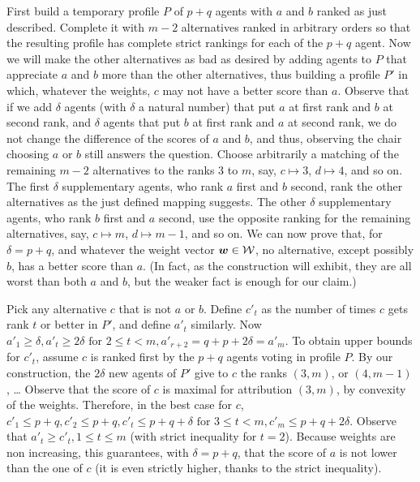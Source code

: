 First build a temporary profile $P$ of $p+q$ agents with $a$ and $b$ ranked as just described. Complete it with $m-2$ alternatives ranked in arbitrary orders so that the resulting profile has complete strict rankings for each of the $p+q$ agent. Now we will make the other alternatives as bad as desired by adding agents to $P$ that appreciate $a$ and $b$ more than the other alternatives, thus building a profile $P'$ in which, whatever the weights, $c$ may not have a better score than $a$. Observe that if we add $\delta$ agents (with $\delta$ a natural number) that put $a$ at first rank and $b$ at second rank, and $\delta$ agents that put $b$ at first rank and $a$ at second rank, we do not change the difference of the scores of $a$ and $b$, and thus, observing the chair choosing $a$ or $b$ still answers the question. Choose arbitrarily a matching of the remaining $m-2$ alternatives to the ranks $3$ to $m$, say, $c \mapsto 3$, $d \mapsto 4$, and so on. The first $\delta$ supplementary agents, who rank $a$ first and $b$ second, rank the other alternatives as the just defined mapping suggests. The other $\delta$ supplementary agents, who rank $b$ first and $a$ second, use the opposite ranking for the remaining alternatives, say, $c \mapsto m$, $d \mapsto m-1$, and so on. We can now prove that, for $\delta = p+q$, and whatever the weight vector $\bm{w} \in \mathcal{W}$, no alternative, except possibly $b$, has a better score than $a$. (In fact, as the construction will exhibit, they are all worst than both $a$ and $b$, but the weaker fact is enough for our claim.)

Pick any alternative $c$ that is not $a$ or $b$. 
Define $c'_t$ as the number of times $c$ gets rank $t$ or better in $P'$, and define $a'_t$ similarly. Now $a'_1 ≥ \delta, a'_t ≥ 2\delta \text{ for } 2 ≤ t < m, a'_{r+2} = q+p+2\delta = a'_m$. To obtain upper bounds for $c'_t$, assume $c$ is ranked first by the $p+q$ agents voting in profile $P$. By our construction, the  $2 \delta$ new agents of $P'$ give to $c$ the ranks $(3, m)$, or $(4, m-1)$, … Observe that the score of $c$ is maximal for attribution $(3, m)$, by convexity of the weights. Therefore, in the best case for $c$, $c'_1 ≤ p + q, c'_2 ≤ p+q, c'_t ≤ p+q+\delta \text{ for } 3 ≤ t < m, c'_m ≤ p+q+2\delta$. Observe that $a'_t ≥ c'_t, 1 ≤ t ≤ m$ (with strict inequality for $t=2$). Because weights are non increasing, this guarantees, with $\delta = p + q$, that the score of $a$ is not lower than the one of $c$ (it is even strictly higher, thanks to the strict inequality).

